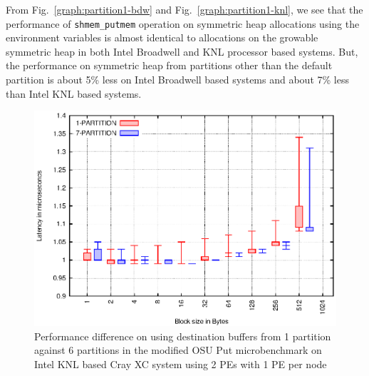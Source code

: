From Fig.~\ref{graph:partition1-bdw} and
Fig.~\ref{graph:partition1-knl}, we see that the performance of
\texttt{shmem\_putmem} operation on symmetric heap allocations
using the environment variables is almost identical to allocations
on the growable symmetric heap in both Intel Broadwell
and KNL processor based systems. But, the performance on symmetric
heap from partitions other than the default partition is about 5\%
less on Intel Broadwell based systems and about 7\% less than
Intel KNL based systems.



\begin{figure}[ht!]
    \vspace{-25pt}
    \centering
    \includegraphics[width=\linewidth]{graph/osu-put.eps}
    \caption{Performance difference on using destination buffers
    from 1 partition against 6 partitions in the modified OSU Put
    microbenchmark on Intel KNL based Cray XC system using 2 PEs
    with 1 PE per node}
    \label{graph:lookup}
    \vspace{-30pt}
\end{figure}

